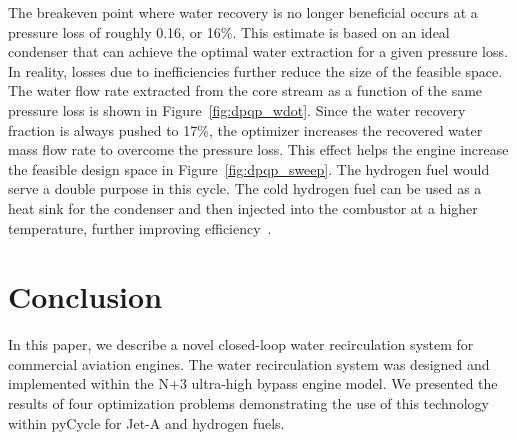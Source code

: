 \documentclass[conf]{new-aiaa}
\begin{document}
The breakeven point where water recovery is no longer beneficial occurs at a pressure loss of roughly 0.16, or 16\%.
This estimate is based on an ideal condenser that can achieve the optimal water extraction for a given pressure loss.
In reality, losses due to inefficiencies further reduce the size of the feasible space.
The water flow rate extracted from the core stream as a function of the same pressure loss is shown in Figure~\ref{fig:dpqp_wdot}.
Since the water recovery fraction is always pushed to 17\%, the optimizer increases the recovered water mass flow rate to overcome the pressure loss.
This effect helps the engine increase the feasible design space in Figure~\ref{fig:dpqp_sweep}.
The hydrogen fuel would serve a double purpose in this cycle.
The cold hydrogen fuel can be used as a heat sink for the condenser and then injected into the combustor at a higher temperature, further improving efficiency~\cite{Boggia2002}.

\section{Conclusion}
\label{sec:conc}
In this paper, we describe a novel closed-loop water recirculation system for commercial aviation engines.
The water recirculation system was designed and implemented within the N+3 ultra-high bypass engine model.
We presented the results of four optimization problems demonstrating the use of this technology within pyCycle for Jet-A and hydrogen fuels.
\end{document}
